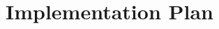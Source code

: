\documentclass[../Main.tex]{subfiles}
\begin{document}
\section{Implementation Plan}

\biblio %
\end{document}
